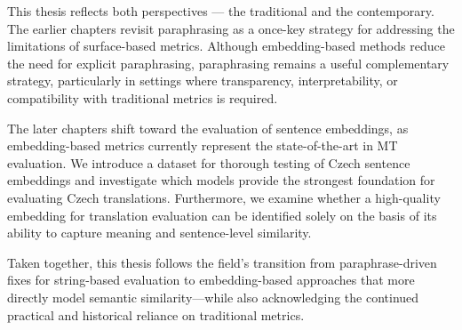This thesis reflects both perspectives --- the traditional and the contemporary. The earlier chapters revisit paraphrasing as a once-key strategy for addressing the limitations of surface-based metrics. Although embedding-based methods reduce the need for explicit paraphrasing, paraphrasing remains a useful complementary strategy, particularly in settings where transparency, interpretability, or compatibility with traditional metrics is required.

The later chapters shift toward the evaluation of sentence embeddings, as embedding-based metrics currently represent the state-of-the-art in MT evaluation. We introduce a dataset for thorough testing of Czech sentence embeddings and investigate which models provide the strongest foundation for evaluating Czech translations. Furthermore, we examine whether a high-quality embedding for translation evaluation can be identified solely on the basis of its ability to capture meaning and sentence-level similarity.

Taken together, this thesis follows the field’s transition from paraphrase-driven fixes for string-based evaluation to embedding-based approaches that more directly model semantic similarity---while also acknowledging the continued practical and historical reliance on traditional metrics.
